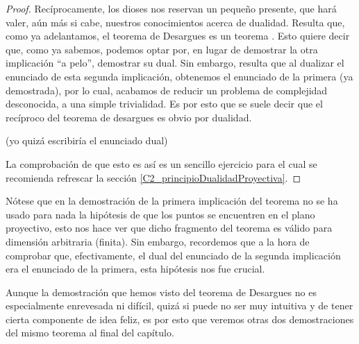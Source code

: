 \begin{proof}
	Recíprocamente, los dioses nos reservan un pequeño presente, que hará valer, aún más si cabe, nuestros conocimientos acerca de dualidad. Resulta que, como ya adelantamos, el teorema de Desargues es un teorema . Esto quiere decir que, como ya sabemos, podemos optar por, en lugar de demostrar la otra implicación ``a pelo'', demostrar su dual. Sin embargo, resulta que al dualizar el enunciado de esta segunda implicación, obtenemos el enunciado de la primera (ya demostrada), por lo cual, acabamos de reducir un problema de complejidad desconocida, a una simple trivialidad. Es por esto que se suele decir que el recíproco del teorema de desargues es obvio por dualidad.
	
	(yo quizá escribiría el enunciado dual)
	
	La comprobación de que esto es así es un sencillo ejercicio para el cual se recomienda refrescar la sección \ref{C2_principioDualidadProyectiva}.
\end{proof}
Nótese que en la demostración de la primera implicación del teorema no se ha usado para nada la hipótesis de que los puntos se encuentren en el plano proyectivo, esto nos hace ver que dicho fragmento del teorema es válido para dimensión arbitraria (finita). Sin embargo, recordemos que a la hora de comprobar que, efectivamente, el dual del enunciado de la segunda implicación era el enunciado de la primera, esta hipótesis nos fue crucial.

Aunque la demostración que hemos visto del teorema de Desargues no es especialmente enrevesada ni difícil, quizá si puede no ser muy intuitiva y de tener cierta componente de idea feliz, es por esto que veremos otras dos demostraciones del mismo teorema al final del capítulo.
